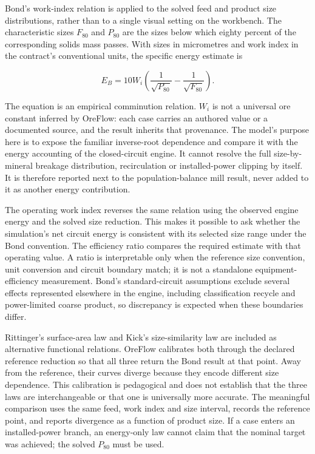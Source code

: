 \documentclass[10pt]{article}
\begin{document}
Bond's work-index relation is applied to the solved feed and product
size distributions, rather than to a single visual setting on the
workbench. The characteristic sizes \(F_{80}\) and \(P_{80}\) are the
sizes below which eighty percent of the corresponding solids mass
passes. With sizes in micrometres and work index in the contract's
conventional units, the specific energy estimate is

\[E_B=10W_i\left(\frac{1}{\sqrt{P_{80}}}-\frac{1}{\sqrt{F_{80}}}\right).\]

The equation is an empirical comminution relation. \(W_i\) is not a
universal ore constant inferred by OreFlow: each case carries an
authored value or a documented source, and the result inherits that
provenance. The model's purpose here is to expose the familiar
inverse-root dependence and compare it with the energy accounting of the
closed-circuit engine. It cannot resolve the full size-by-mineral
breakage distribution, recirculation or installed-power clipping by
itself. It is therefore reported next to the population-balance mill
result, never added to it as another energy contribution.

The operating work index reverses the same relation using the observed
engine energy and the solved size reduction. This makes it possible to
ask whether the simulation's net circuit energy is consistent with its
selected size range under the Bond convention. The efficiency ratio
compares the required estimate with that operating value. A ratio is
interpretable only when the reference size convention, unit conversion
and circuit boundary match; it is not a standalone equipment-efficiency
measurement. Bond's standard-circuit assumptions exclude several effects
represented elsewhere in the engine, including classification recycle
and power-limited coarse product, so discrepancy is expected when these
boundaries differ.

Rittinger's surface-area law and Kick's size-similarity law are included
as alternative functional relations. OreFlow calibrates both through the
declared reference reduction so that all three return the Bond result at
that point. Away from the reference, their curves diverge because they
encode different size dependence. This calibration is pedagogical and
does not establish that the three laws are interchangeable or that one
is universally more accurate. The meaningful comparison uses the same
feed, work index and size interval, records the reference point, and
reports divergence as a function of product size. If a case enters an
installed-power branch, an energy-only law cannot claim that the nominal
target was achieved; the solved \(P_{80}\) must be used.
\end{document}
